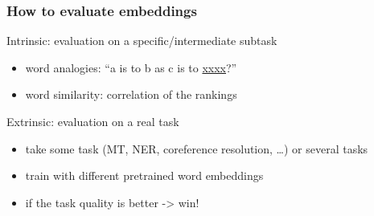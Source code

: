 









\begin{frame}[fragile]\frametitle{How to evaluate embeddings}
Intrinsic: evaluation on a specific/intermediate subtask
\begin{itemize}
\item  word analogies: “a is to b as c is to \underline{xxxx}?” 
\item  word similarity: correlation of the rankings
\end{itemize}
Extrinsic: evaluation on a real task
\begin{itemize}
\item  take some task (MT, NER, coreference resolution, …) or several tasks
\item   train with different pretrained word embeddings
\item  if the task quality is better -> win!
\end{itemize}
\end{frame}



